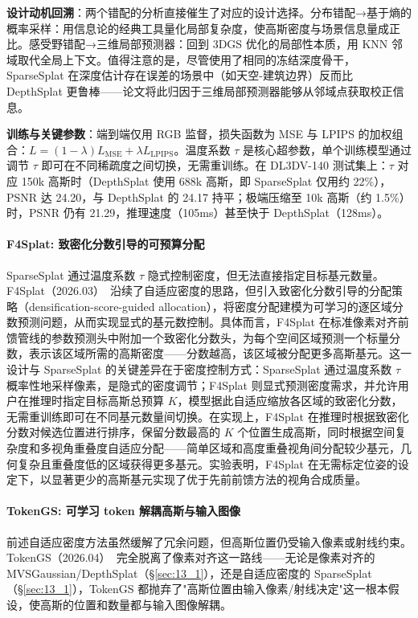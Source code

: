 \textbf{设计动机回溯}：两个错配的分析直接催生了对应的设计选择。分布错配→基于熵的概率采样：用信息论的经典工具量化局部复杂度，使高斯密度与场景信息量成正比。感受野错配→三维局部预测器：回到 3DGS 优化的局部性本质，用 KNN 邻域取代全局上下文。值得注意的是，尽管使用了相同的冻结深度骨干，SparseSplat 在深度估计存在误差的场景中（如天空-建筑边界）反而比 DepthSplat 更鲁棒——论文将此归因于三维局部预测器能够从邻域点获取校正信息。

\textbf{训练与关键参数}：端到端仅用 RGB 监督，损失函数为 MSE 与 LPIPS 的加权组合：$L = (1-\lambda)L_{\text{MSE}} + \lambda L_{\text{LPIPS}}$。温度系数 $\tau$ 是核心超参数，单个训练模型通过调节 $\tau$ 即可在不同稀疏度之间切换，无需重训练。在 DL3DV-140 测试集上：$\tau$ 对应 150k 高斯时（DepthSplat 使用 688k 高斯，即 SparseSplat 仅用约 22\%），PSNR 达 24.20，与 DepthSplat 的 24.17 持平；极端压缩至 10k 高斯（约 1.5\%）时，PSNR 仍有 21.29，推理速度（105ms）甚至快于 DepthSplat（128ms）。

\paragraph{F4Splat: 致密化分数引导的可预算分配}

SparseSplat 通过温度系数 $\tau$ 隐式控制密度，但无法直接指定目标基元数量。F4Splat（2026.03）~\cite{2603_21304}沿续了自适应密度的思路，但引入致密化分数引导的分配策略（densification-score-guided allocation），将密度分配建模为可学习的逐区域分数预测问题，从而实现显式的基元数控制。具体而言，F4Splat 在标准像素对齐前馈管线的参数预测头中附加一个致密化分数头，为每个空间区域预测一个标量分数，表示该区域所需的高斯密度——分数越高，该区域被分配更多高斯基元。这一设计与 SparseSplat 的关键差异在于密度控制方式：SparseSplat 通过温度系数 $\tau$ 概率性地采样像素，是隐式的密度调节；F4Splat 则显式预测密度需求，并允许用户在推理时指定目标高斯总预算 $K$，模型据此自适应缩放各区域的致密化分数，无需重训练即可在不同基元数量间切换。在实现上，F4Splat 在推理时根据致密化分数对候选位置进行排序，保留分数最高的 $K$ 个位置生成高斯，同时根据空间复杂度和多视角重叠度自适应分配——简单区域和高度重叠视角间分配较少基元，几何复杂且重叠度低的区域获得更多基元。实验表明，F4Splat 在无需标定位姿的设定下，以显著更少的高斯基元实现了优于先前前馈方法的视角合成质量。

\paragraph{TokenGS: 可学习 token 解耦高斯与输入图像}

前述自适应密度方法虽然缓解了冗余问题，但高斯位置仍受输入像素或射线约束。TokenGS（2026.04）~\cite{2604_15239}完全脱离了像素对齐这一路线——无论是像素对齐的 MVSGaussian/DepthSplat（\S\ref{sec:13_1}），还是自适应密度的 SparseSplat（\S\ref{sec:13_1}），TokenGS 都抛弃了"高斯位置由输入像素/射线决定"这一根本假设，使高斯的位置和数量都与输入图像解耦。

